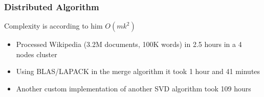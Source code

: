 \begin{frame}[plain]
\frametitle{Distributed Algorithm}
\begin{block}{}
      Complexity is according to him $O(mk^2)$
      \begin{itemize}
      \item Processed Wikipedia (3.2M documents, 100K words) in 2.5 hours in a 4 nodes cluster
      \item Using BLAS/LAPACK in the merge algorithm it took 1 hour and 41 minutes
      \item Another custom implementation of another SVD algorithm took 109
hours
      \end{itemize}
\end{block} 
\end{frame}
